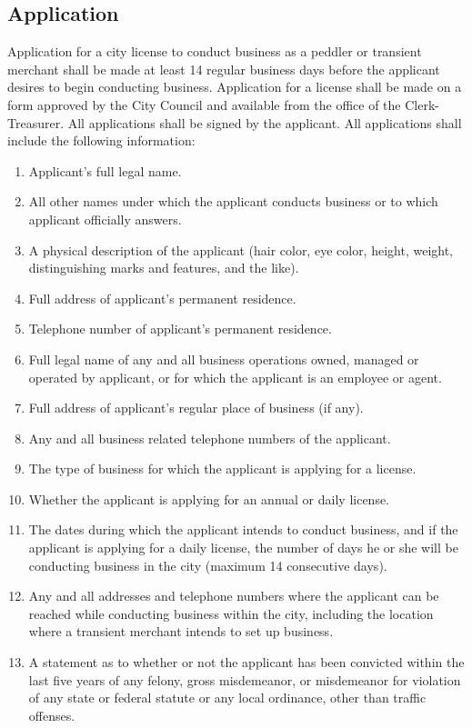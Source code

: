 \subsection{Application}
Application for a city license to conduct business as a peddler or transient merchant shall be made at least 14 regular business days before the applicant desires to begin conducting business. Application for a license shall be made on a form approved by the City Council and available from the office of the Clerk-Treasurer. All applications shall be signed by the applicant.  All applications shall include the following information:
\begin{enumerate}[{\indent}1)]
    \item Applicant’s full legal name.
    \item All other names under which the applicant conducts business or to which applicant officially answers.
    \item A physical description of the applicant (hair color, eye color, height, weight, distinguishing marks and features, and the like).
    \item Full address of applicant’s permanent residence.
    \item Telephone number of applicant’s permanent residence.
    \item Full legal name of any and all business operations owned, managed or operated by applicant, or for which the applicant is an employee or agent.
    \item Full address of applicant’s regular place of business (if any).
    \item Any and all business related telephone numbers of the applicant.
    \item The type of business for which the applicant is applying for a license.
    \item Whether the applicant is applying for an annual or daily license.
    \item The dates during which the applicant intends to conduct business, and if the applicant is applying for a daily license, the number of days he or she will be conducting business in the city (maximum 14 consecutive days).
    \item Any and all addresses and telephone numbers where the applicant can be reached while conducting business within the city, including the location where a transient merchant intends to set up business.
    \item A statement as to whether or not the applicant has been convicted within the last five years of any felony, gross misdemeanor, or misdemeanor for violation of any state or federal statute or any local ordinance, other than traffic offenses.

\end{enumerate}
